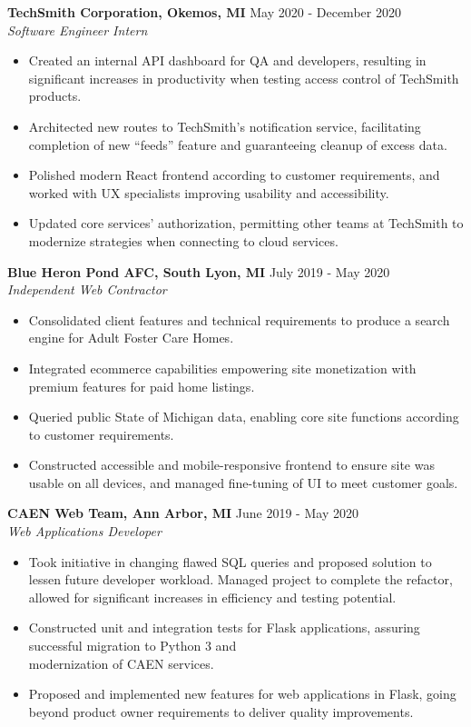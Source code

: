 \documentclass[overlapped]{res}
\begin{document}
\begin{resume}
    \textbf{TechSmith Corporation, Okemos, MI}
    \hfill May 2020 - December 2020 \\
    {\sl Software Engineer Intern}
    \begin{itemize}  \itemsep -2pt %
        \item Created an internal API dashboard for QA and developers, resulting in significant increases in productivity when testing access control of TechSmith products.
        \item Architected new routes to TechSmith's notification service, facilitating completion of new ``feeds'' feature and guaranteeing cleanup of excess data.
        \item Polished modern React frontend according to customer requirements, and worked with UX specialists improving usability and accessibility.
        \item Updated core services' authorization, permitting other teams at TechSmith to modernize strategies when connecting to cloud services.
    \end{itemize}
    
    \textbf{Blue Heron Pond AFC, South Lyon, MI}
    \hfill July 2019 - May 2020 \\
    {\sl Independent Web Contractor}
    \begin{itemize}  \itemsep -2pt %
        \item Consolidated client features and technical requirements to produce a search engine for Adult Foster Care Homes.
        \item Integrated ecommerce capabilities empowering site monetization with premium features for paid home listings.
        \item Queried public State of Michigan data, enabling core site functions according to customer requirements.
        \item Constructed accessible and mobile-responsive frontend to ensure site was usable on all devices, and managed fine-tuning of UI to meet customer goals.
    \end{itemize}
    
    \textbf{CAEN Web Team, Ann Arbor, MI}
    \hfill June 2019 - May 2020 \\
    {\sl Web Applications Developer}
    \begin{itemize}  \itemsep -2pt %
        \item Took initiative in changing flawed SQL queries and proposed solution to lessen future developer workload. Managed project to complete the refactor, allowed for significant increases in efficiency and testing potential.
        \item Constructed unit and integration tests for Flask applications, assuring successful migration to Python 3 and \\ modernization of CAEN services.
        \item Proposed and implemented new features for web applications in Flask, going beyond product owner requirements to deliver quality improvements.
    \end{itemize}
    

\end{resume}
\end{document}
